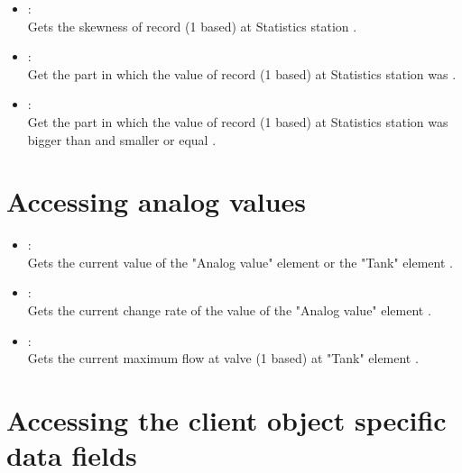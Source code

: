 \begin{itemize}
\item
{}:\\
Gets the skewness of record  (1 based) at Statistics station .

\item
{}:\\
Get the part in which the value of record  (1 based) at Statistics station  was .

\item
{}:\\
Get the part in which the value of record  (1 based) at Statistics station  was bigger than  and smaller or equal .

\end{itemize}



\section{Accessing analog values}
  
\begin{itemize}

\item
{}:\\
Gets the current value of the "Analog value" element or the "Tank" element .

\item
{}:\\
Gets the current change rate of the value of the "Analog value" element .

\item
{}:\\
Gets the current maximum flow at valve  (1 based) at "Tank" element .

\end{itemize}



\section{Accessing the client object specific data fields}


